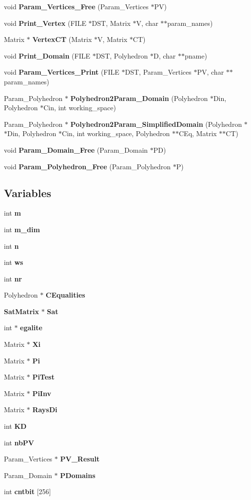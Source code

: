 \begin{CompactItemize}
\item 
void {\bf Param\_\-Vertices\_\-Free} (Param\_\-Vertices $\ast$PV)
\item 
void {\bf Print\_\-Vertex} (FILE $\ast$DST, Matrix $\ast$V, char $\ast$$\ast$param\_\-names)
\item 
Matrix $\ast$ {\bf Vertex\-CT} (Matrix $\ast$V, Matrix $\ast$CT)
\item 
void {\bf Print\_\-Domain} (FILE $\ast$DST, Polyhedron $\ast$D, char $\ast$$\ast$pname)
\item 
void {\bf Param\_\-Vertices\_\-Print} (FILE $\ast$DST, Param\_\-Vertices $\ast$PV, char $\ast$$\ast$param\_\-names)
\item 
Param\_\-Polyhedron $\ast$ {\bf Polyhedron2Param\_\-Domain} (Polyhedron $\ast$Din, Polyhedron $\ast$Cin, int working\_\-space)
\item 
Param\_\-Polyhedron $\ast$ {\bf Polyhedron2Param\_\-Simplified\-Domain} (Polyhedron $\ast$$\ast$Din, Polyhedron $\ast$Cin, int working\_\-space, Polyhedron $\ast$$\ast$CEq, Matrix $\ast$$\ast$CT)
\item 
void {\bf Param\_\-Domain\_\-Free} (Param\_\-Domain $\ast$PD)
\item 
void {\bf Param\_\-Polyhedron\_\-Free} (Param\_\-Polyhedron $\ast$P)
\end{CompactItemize}
\subsection*{Variables}
\begin{CompactItemize}
\item 
int {\bf m}
\item 
int {\bf m\_\-dim}
\item 
int {\bf n}
\item 
int {\bf ws}
\item 
int {\bf nr}
\item 
Polyhedron $\ast$ {\bf CEqualities}
\item 
{\bf Sat\-Matrix} $\ast$ {\bf Sat}
\item 
int $\ast$ {\bf egalite}
\item 
Matrix $\ast$ {\bf Xi}
\item 
Matrix $\ast$ {\bf Pi}
\item 
Matrix $\ast$ {\bf Pi\-Test}
\item 
Matrix $\ast$ {\bf Pi\-Inv}
\item 
Matrix $\ast$ {\bf Rays\-Di}
\item 
int {\bf KD}
\item 
int {\bf nb\-PV}
\item 
Param\_\-Vertices $\ast$ {\bf PV\_\-Result}
\item 
Param\_\-Domain $\ast$ {\bf PDomains}
\item 
int {\bf cntbit} [256]
\end{CompactItemize}


